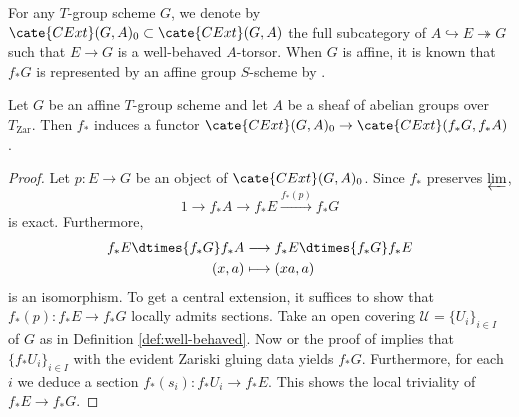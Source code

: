 \documentclass[a4paper,10pt]{article}
\begin{document}
For any $T$-group scheme $G$, we denote by $\cate{CExt}(G,A)_0 \subset \cate{CExt}(G,A)$ the full subcategory of $A \hookrightarrow E \twoheadrightarrow G$ such that $E \to G$ is a well-behaved $A$-torsor. When $G$ is affine, it is known that $f_* G$ is represented by an affine group $S$-scheme by \cite[p.194, Theorem 4]{BLR90}.

\begin{proposition}\label{prop:well-behaved}
	Let $G$ be an affine $T$-group scheme and let $A$ be a sheaf of abelian groups over $T_\mathrm{Zar}$. Then $f_*$ induces a functor $\cate{CExt}(G,A)_0 \to \cate{CExt}(f_* G, f_* A)$.
\end{proposition}
\begin{proof}
	Let $p: E \to G$ be an object of $\cate{CExt}(G,A)_0$. Since $f_*$ preserves $\varprojlim$,
	\[ 1 \to f_* A \to f_* E \xrightarrow{f_*(p)} f_* G \]
	is exact. Furthermore,
	\begin{align*}
		f_* E \dtimes{f_* G} f_* A & \longrightarrow f_* E \dtimes{f_* G} f_* E \\
		(x,a) & \longmapsto (xa,a)
	\end{align*}
	is an isomorphism. To get a central extension, it suffices to show that $f_*(p): f_* E \to f_* G$ locally admits sections. Take an open covering $\mathcal{U} = \{U_i\}_{i \in I}$ of $G$ as in Definition \ref{def:well-behaved}. Now \cite{113891} or the proof of \cite[p.194, Theorem 4]{BLR90} implies that $\{ f_* U_i\}_{i \in I}$ with the evident Zariski gluing data yields $f_* G$. Furthermore, for each $i$ we deduce a section $f_*(s_i): f_* U_i \to f_* E$. This shows the local triviality of $f_* E \to f_* G$.
\end{proof}
\end{document}
